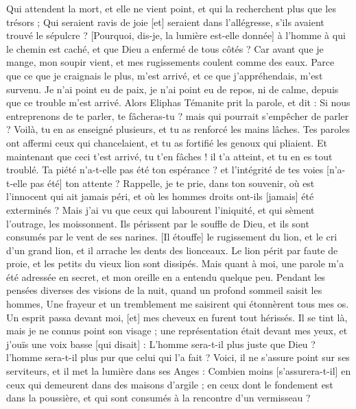 \begin{multicols}{2}
Qui attendent la mort, et elle ne vient point, et qui la recherchent plus que les trésors ;
Qui seraient ravis de joie [et] seraient dans l'allégresse, s'ils avaient trouvé le sépulcre ?
[Pourquoi, dis-je, la lumière est-elle donnée] à l'homme à qui le chemin est caché, et que Dieu a enfermé de tous côtés ?
Car avant que je mange, mon soupir vient, et mes rugissements coulent comme des eaux.
Parce que ce que je craignais le plus, m'est arrivé, et ce que j'appréhendais, m'est survenu.
Je n'ai point eu de paix, je n'ai point eu de repos, ni de calme, depuis que ce trouble m'est arrivé.
\VerseOne{}Alors Eliphas Témanite prit la parole, et dit :
Si nous entreprenons de te parler, te fâcheras-tu ? mais qui pourrait s'empêcher de parler ?
Voilà, tu en as enseigné plusieurs, et tu as renforcé les mains lâches.
Tes paroles ont affermi ceux qui chancelaient, et tu as fortifié les genoux qui pliaient.
Et maintenant que ceci t'est arrivé, tu t'en fâches ! il t'a atteint, et tu en es tout troublé.
Ta piété n'a-t-elle pas été ton espérance ? et l'intégrité de tes voies [n'a-t-elle pas été] ton attente ?
Rappelle, je te prie, dans ton souvenir, où est l'innocent qui ait jamais péri, et où les hommes droits ont-ils [jamais] été exterminés ?
Mais j'ai vu que ceux qui labourent l'iniquité, et qui sèment l'outrage, les moissonnent.
Ils périssent par le souffle de Dieu, et ils sont consumés par le vent de ses narines.
[Il étouffe] le rugissement du lion, et le cri d'un grand lion, et il arrache les dents des lionceaux.
Le lion périt par faute de proie, et les petits du vieux lion sont dissipés.
Mais quant à moi, une parole m'a été adressée en secret, et mon oreille en a entendu quelque peu.
Pendant les pensées diverses des visions de la nuit, quand un profond sommeil saisit les hommes,
Une frayeur et un tremblement me saisirent qui étonnèrent tous mes os.
Un esprit passa devant moi, [et] mes cheveux en furent tout hérissés.
Il se tint là, mais je ne connus point son visage ; une représentation était devant mes yeux, et j'ouïs une voix basse [qui disait] :
L'homme sera-t-il plus juste que Dieu ? l'homme sera-t-il plus pur que celui qui l'a fait ?
Voici, il ne s'assure point sur ses serviteurs, et il met la lumière dans ses Anges :
Combien moins [s'assurera-t-il] en ceux qui demeurent dans des maisons d'argile ; en ceux dont le fondement est dans la poussière, et qui sont consumés à la rencontre d'un vermisseau ?

\end{multicols}
